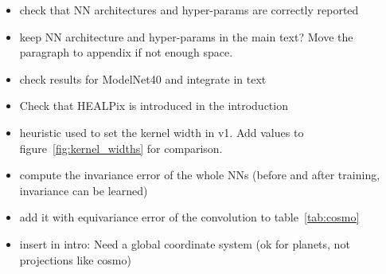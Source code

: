 \documentclass{article} %
\newcommand{\todo}[1]{{\color[rgb]{.6,.1,.6}{#1}}}
\newcommand{\figref}[1]{figure~\ref{fig:#1}}
\newcommand{\tabref}[1]{table~\ref{tab:#1}}
\begin{document}
{\begin{itemize}
	\item check that NN architectures and hyper-params are correctly reported
	\item keep NN architecture and hyper-params in the main text? Move the paragraph to appendix if not enough space.
	\item check results for ModelNet40 and integrate in text
	\item Check that HEALPix is introduced in the introduction
	\item heuristic used to set the kernel width in v1. Add values to \figref{kernel_widths} for comparison.
	\item compute the invariance error of the whole NNs (before and after training, invariance can be learned)
	\item add it with equivariance error of the convolution to \tabref{cosmo}
	\item insert \citet{jiang2019sphericalcnn} in intro: Need a global coordinate system (ok for planets, not projections like cosmo)
\end{itemize}
}

\todo{
rebuttal:
\begin{itemize}
    \item answer reviewers and commenters [mdeff \& nath]
    \item update the proof [nath \& martino]
    \item better link between the proof and equivarian
    \item publish the code and link it here
	\item swap AR and TC on figure 1
	\item add somewhere: exploit symmetries to reduce sample cost
	\item proposition 1 -> corollary 3.1?
\end{itemize}
}

\clearpage
\newpage

\maketitle
\end{document}
